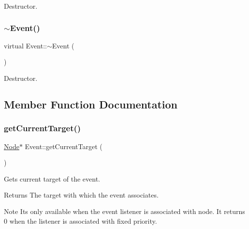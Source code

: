 Destructor. \mbox{\label{classEvent_ab864fd85c758006c42cd7a1b3369b483}} 
\subsubsection{\texorpdfstring{$\sim$\+Event()}{~Event()}\hspace{0.1cm}{\footnotesize\ttfamily [2/2]}}
{\footnotesize\ttfamily virtual Event\+::$\sim$\+Event (\begin{DoxyParamCaption}{ }\end{DoxyParamCaption})\hspace{0.3cm}{\ttfamily [virtual]}}

Destructor. 

\subsection{Member Function Documentation}
\mbox{\label{classEvent_a10651de3003e2762867b80b5f2db6fa1}} 
\subsubsection{\texorpdfstring{get\+Current\+Target()}{getCurrentTarget()}\hspace{0.1cm}{\footnotesize\ttfamily [1/2]}}
{\footnotesize\ttfamily \hyperlink{classNode}{Node}$\ast$ Event\+::get\+Current\+Target (\begin{DoxyParamCaption}{ }\end{DoxyParamCaption})\hspace{0.3cm}{\ttfamily [inline]}}

Gets current target of the event. \begin{DoxyReturn}{Returns}
The target with which the event associates. 
\end{DoxyReturn}
\begin{DoxyNote}{Note}
It\textquotesingle{}s only available when the event listener is associated with node. It returns 0 when the listener is associated with fixed priority. 
\end{DoxyNote}
\mbox{\label{classEvent_a10651de3003e2762867b80b5f2db6fa1}} 
